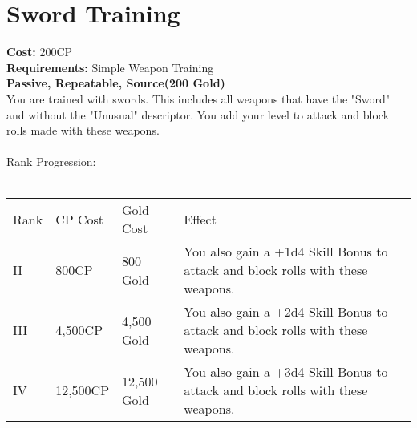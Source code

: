 \section{Sword Training}\label{perk:swordTraining}
\textbf{Cost:} 200CP\\
\textbf{Requirements:} Simple Weapon Training\\
\textbf{Passive, Repeatable, Source(200 Gold)}\\
You are trained with swords.
This includes all weapons that have the "Sword" and without the "Unusual" descriptor.
You add your level to attack and block rolls made with these weapons.\\
\\
Rank Progression:\\
\\
\begin{longtable}{l | l | l | p{9cm}}
	Rank & CP Cost & Gold Cost & Effect\\
	II & 800CP & 800 Gold & You also gain a +1d4 Skill Bonus to attack and block rolls with these weapons.\\
	III & 4,500CP & 4,500 Gold & You also gain a +2d4 Skill Bonus to attack and block rolls with these weapons.\\
	IV & 12,500CP & 12,500 Gold & You also gain a +3d4 Skill Bonus to attack and block rolls with these weapons.\\
\end{longtable}